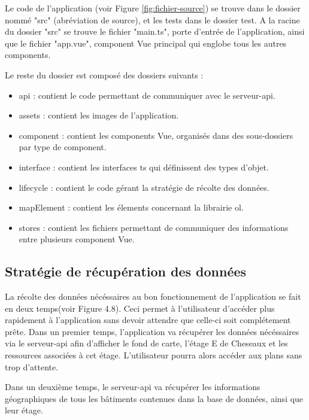 \documentclass[
    iai, %
    il, %
]{heig-tb}
\begin{document}
Le code de l'application (voir Figure \ref{fig:fichier-source}) se trouve dans le dossier nommé "src" (abréviation de source), et les tests dans le dossier test.
A la racine du dossier "src" se trouve le fichier "main.ts", porte d'entrée de l'application,
ainsi que le fichier "app.vue", component Vue principal qui englobe tous les autres components.

Le reste du dossier est composé des dossiers suivants :
\begin{itemize}
    \item api : contient le code permettant de communiquer avec le serveur-api.
    \item assets : contient les images de l'application.
    \item component : contient les components Vue, organisés dans des sous-dossiers par type de component.
    \item interface : contient les interfaces \gls{ts} qui définissent des types d'objet.
    \item lifecycle : contient le code gérant la stratégie de récolte des données.
    \item mapElement : contient les élements concernant la librairie \gls{ol}.
    \item stores : contient les fichiers permettant de communiquer des informations entre plusieurs component Vue.
\end{itemize}

\subsection{Stratégie de récupération des données}


La récolte des données nécéssaires au bon fonctionnement de l'application se fait en deux temps(voir Figure 4.8).
Ceci permet à l'utilisateur d'accéder plus rapidement à l'application sans devoir attendre que celle-ci soit complétement prête.
Dans un premier temps, l'application va récupérer les données nécéssaires via le serveur-api
afin d'afficher le fond de carte, l'étage E de Cheseaux et les ressources associées à cet étage.
L'utilisateur pourra alors accéder aux plans sans trop d'attente.

Dans un deuxième temps, le serveur-api va récupérer les informations géographiques de tous les bâtiments contenues dans la base de données,
ainsi que leur étage.
\end{document}

